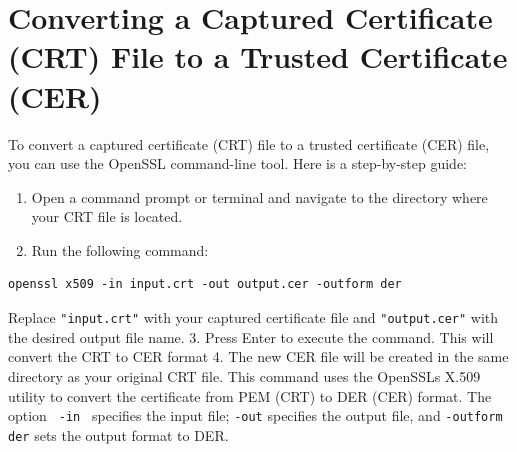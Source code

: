\section{Converting a Captured Certificate (CRT) File to a Trusted Certificate (CER)}
To convert a captured certificate (CRT) file to a trusted certificate (CER) file, you can use the OpenSSL command-line tool. Here is a step-by-step guide:
\begin{enumerate}
    \item Open a command prompt or terminal and navigate to the directory where your CRT file is located.
    \item Run the following command:
\end{enumerate}
\begin{notebox}
\begin{verbatim}
openssl x509 -in input.crt -out output.cer -outform der
\end{verbatim}
\end{notebox}
Replace \verb|"input.crt"| with your captured certificate file and \verb|"output.cer"| with the desired output file name.
    3. Press Enter to execute the command. This will convert the CRT to CER format
    4. The new CER file will be created in the same directory as your original CRT file.
This command uses the OpenSSLs X.509 utility to convert the certificate from PEM (CRT) to DER (CER) format. The option \verb | -in | specifies the input file; \verb|-out| specifies the output file, and \verb|-outform der| sets the output format to DER.

